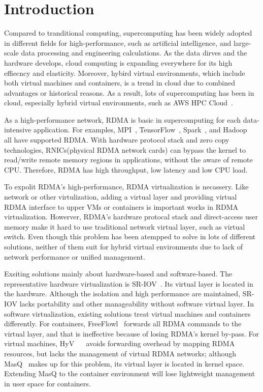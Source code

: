 \section{Introduction}
Compared to tranditional computing, supercomputing has been widely adopted in different fields for high-performance, such as artificial intelligence, and large-scale data processing and engineering calculations. As the data dirves and the hardware develops, cloud computing is expanding everywhere for its high effiecncy and elasticity. Moreover, hybird virtual environments, which include both virtual machines and containers, is a trend in cloud due to combined advantages or historical reasons. As a result, lots of supercomputing has been in cloud, especially hybrid virtual environments, such as AWS HPC Cloud~\cite{aws-hpc}. 

As a high-performance network, RDMA is basic in supercomputing for each data-intensive application. For examples, MPI~\cite{mpi2004}, TensorFlow~\cite{abadi2016tensorflow}, Spark~\cite{spark-rdma}, and Hadoop~\cite{hadoop-rdma} all have supported RDMA. With hardware protocol stack and zero copy technologies, RNICs(physical RDMA network cards) can bypass the kernel to read/write remote memory regions in applications, without the aware of remote CPU. Therefore, RDMA has high throughput, low latency and low CPU load.

To expolit RDMA's high-performance, RDMA virtualization is necassery. Like network or other virtulization, adding a virtual layer and providing virtual RDMA interface to upper VMs or containers is important works in RDMA virtualization. Howerver, RDMA's hardware protocal stack and direct-access user memory make it hard to use traditional network virtual layer, such as virtual switch. Even though this problem has been atempped to solve in lots of different solutions, neither of them suit for hybrid virtual environments due to lack of network performance or unified management.

Exsiting solutions mainly about hardware-based and software-based. The representative hardware virtualization is SR-IOV~\cite{sr-iov}. Its virtual layer is located in the hardware. Although the isolation and high performance are maintained,  SR-IOV lacks portability and other manageability without software virtual layer. In software virtualization, existing solutions treat virtual machines and containers differently. For containers, FreeFlowl~\cite{kim2019freeflow} forwards all RDMA commands to the virtual layer, and that is ineffective because of losing RDMA's kernel by-pass. For virtual machines, HyV~\cite{pfefferle2015hybrid} ~\cite{pfefferle2014vverbs} avoids forwarding overhead by mapping RDMA resources, but lacks the management of virtual RDMA networks; although MasQ~\cite{he2020masq} makes up for this problem, its virtual layer is located in kernel space. Extending MasQ to the container environment will lose lightweight  management in user space for containers.

